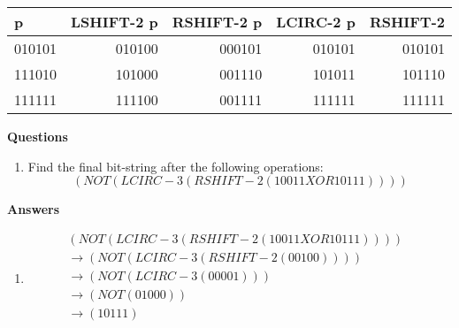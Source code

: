 \documentclass[12pt,letterpaper]{article}
\begin{document}
\begin{center}
  \begin{tabular}{| l || r | r | r | r |}
    \hline
    p & \textbf{LSHIFT-2} p & \textbf{RSHIFT-2} p & \textbf{LCIRC-2} p & \textbf{RSHIFT-2} \\
    \hline \hline
    010101 & 010100 & 000101 & 010101 & 010101 \\
    111010 & 101000 & 001110 & 101011 & 101110 \\
    111111 & 111100 & 001111 & 111111 & 111111 \\
    \hline
  \end{tabular}
\end{center}

\bigskip
\noindent \textbf{Questions}
\begin{enumerate}
\item Find the final bit-string after the following operations:
  \[
  (NOT (LCIRC-3 (RSHIFT-2 (10011 XOR 10111))))
  \]

\end{enumerate}

\pagebreak
\noindent \textbf{Answers}

\begin{enumerate}

\item \begin{align*}
  (NOT (LCIRC-3 (RSHIFT-2 (10011 XOR 10111)))) & \\
  \rightarrow (NOT (LCIRC-3 (RSHIFT-2 (00100)))) &  \\
  \rightarrow (NOT (LCIRC-3 (00001))) &  \\
  \rightarrow (NOT (01000)) & \\
  \rightarrow (10111) & \\
\end{align*}

\end{enumerate}
\end{document}
